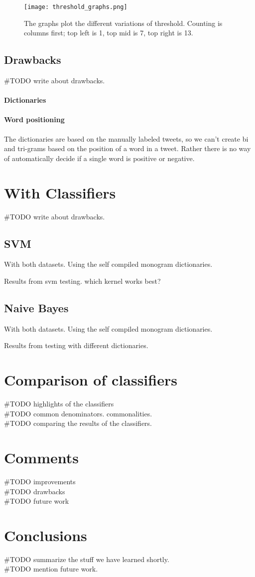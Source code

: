 \begin{figure}[htb]
    \centering
    \texttt{[image: threshold\_graphs.png]} 
    \caption{The graphs plot the different variations of threshold. Counting is
columns first; top left is 1, top mid is 7, top right is 13.}
    \label{fig:threshold_graphs}
\end{figure}

\subsection{Drawbacks}
#TODO write about drawbacks.
\paragraph{Dictionaries}
\paragraph{Word positioning}
The dictionaries are based on the manually labeled
tweets, so we can't create bi and tri-grams based on the position of a word in a tweet.
Rather there is no way of automatically decide if a single word is positive or
negative. 

\section{With Classifiers}

#TODO write about drawbacks. 

\subsection{SVM}
With both datasets.
Using the self compiled monogram dictionaries. 

Results from svm testing. which kernel works best?

\subsection{Naive Bayes}
With both datasets.
Using the self compiled monogram dictionaries. 

Results from testing with different dictionaries. 

\section{Comparison of classifiers}
#TODO highlights of the classifiers \\
#TODO common denominators. commonalities.\\
#TODO comparing the results of the classifiers. \\

\section{Comments}
#TODO improvements \\
#TODO drawbacks \\
#TODO future work \\

\section{Conclusions}
#TODO summarize the stuff we have learned shortly. \\
#TODO mention future work. \\
